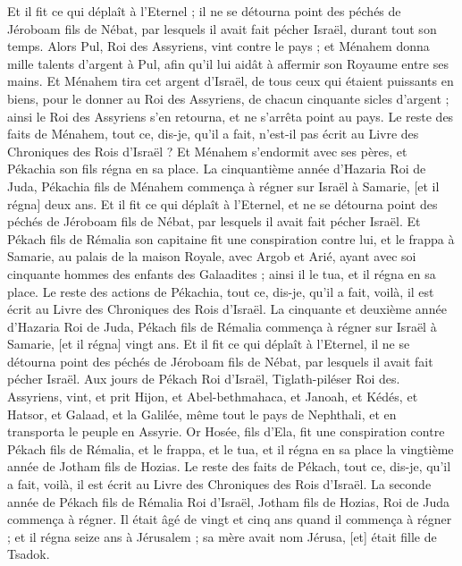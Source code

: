 \begin{multicols}{2}
Et il fit ce qui déplaît à l'Eternel ; il ne se détourna point des péchés de Jéroboam fils de Nébat, par lesquels il avait fait pécher Israël, durant tout son temps.
Alors Pul, Roi des Assyriens, vint contre le pays ; et Ménahem donna mille talents d'argent à Pul, afin qu'il lui aidât à affermir son Royaume entre ses mains.
Et Ménahem tira cet argent d'Israël, de tous ceux qui étaient puissants en biens, pour le donner au Roi des Assyriens, de chacun cinquante sicles d'argent ; ainsi le Roi des Assyriens s'en retourna, et ne s'arrêta point au pays.
Le reste des faits de Ménahem, tout ce, dis-je, qu'il a fait, n'est-il pas écrit au Livre des Chroniques des Rois d'Israël ?
Et Ménahem s'endormit avec ses pères, et Pékachia son fils régna en sa place.
La cinquantième année d'Hazaria Roi de Juda, Pékachia fils de Ménahem commença à régner sur Israël à Samarie, [et il régna] deux ans.
Et il fit ce qui déplaît à l'Eternel, et ne se détourna point des péchés de Jéroboam fils de Nébat, par lesquels il avait fait pécher Israël.
Et Pékach fils de Rémalia son capitaine fit une conspiration contre lui, et le frappa à Samarie, au palais de la maison Royale, avec Argob et Arié, ayant avec soi cinquante hommes des enfants des Galaadites ; ainsi il le tua, et il régna en sa place.
Le reste des actions de Pékachia, tout ce, dis-je, qu'il a fait, voilà, il est écrit au Livre des Chroniques des Rois d'Israël.
La cinquante et deuxième année d'Hazaria Roi de Juda, Pékach fils de Rémalia commença à régner sur Israël à Samarie, [et il régna] vingt ans.
Et il fit ce qui déplaît à l'Eternel, il ne se détourna point des péchés de Jéroboam fils de Nébat, par lesquels il avait fait pécher Israël.
Aux jours de Pékach Roi d'Israël, Tiglath-piléser Roi des. Assyriens, vint, et prit Hijon, et Abel-bethmahaca, et Janoah, et Kédés, et Hatsor, et Galaad, et la Galilée, même tout le pays de Nephthali, et en transporta le peuple en Assyrie.
Or Hosée, fils d'Ela, fit une conspiration contre Pékach fils de Rémalia, et le frappa, et le tua, et il régna en sa place la vingtième année de Jotham fils de Hozias.
Le reste des faits de Pékach, tout ce, dis-je, qu'il a fait, voilà, il est écrit au Livre des Chroniques des Rois d'Israël.
La seconde année de Pékach fils de Rémalia Roi d'Israël, Jotham fils de Hozias, Roi de Juda commença à régner.
Il était âgé de vingt et cinq ans quand il commença à régner ; et il régna seize ans à Jérusalem ; sa mère avait nom Jérusa, [et] était fille de Tsadok.

\end{multicols}
